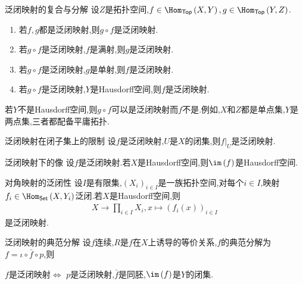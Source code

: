 \begin{proposition}{泛闭映射的复合与分解}{}
	设$Z$是拓扑空间,$f\in\Hom_{\mathsf{Top}}\left(X,Y\right),g\in\Hom_{\mathsf{Top}}\left(Y,Z\right)$.
	\begin{enumerate}
		\item 若$f,g$都是泛闭映射,则$g\circ f$是泛闭映射.
		\item 若$g\circ f$是泛闭映射,$f$是满射,则$g$是泛闭映射.
		\item 若$g\circ f$是泛闭映射,$g$是单射,则$f$是泛闭映射.
		\item 若$g\circ f$是泛闭映射,$Y$是Hausdorff空间,则$f$是泛闭映射.
	\end{enumerate}
\end{proposition}

\begin{remark}{}{}
	若$Y$不是Hausdorff空间,则$g\circ f$可以是泛闭映射而$f$不是.例如,$X$和$Z$都是单点集,$Y$是两点集,三者都配备平庸拓扑.
\end{remark}

\begin{corollary}{泛闭映射在闭子集上的限制}{}
	设$f$是泛闭映射,$U$是$X$的闭集,则$f|_{U}$是泛闭映射.
\end{corollary}

\begin{corollary}{泛闭映射下的像}{}
	设$f$是泛闭映射.若$X$是Hausdorff空间,则$\im\left(f\right)$是Hausdorff空间.
\end{corollary}

\begin{corollary}{对角映射的泛闭性}{}
	设$I$是有限集,$\left(X_{i}\right)_{i\in I}$是一族拓扑空间,对每个$i\in I$,映射$f_{i}\in\Hom_{\mathsf{Set}}\left(X,Y_{i}\right)$泛闭.若$X$是Hausdorff空间,则
	\begin{align*}
		X\to\prod\limits_{i\in I}X_{i},x\mapsto\left(f_{i}\left(x\right)\right)_{i\in I}
	\end{align*}
	是泛闭映射.
\end{corollary}

\begin{corollary}{泛闭映射的典范分解}{}
	设$f$连续,$R$是$f$在$X$上诱导的等价关系,$f$的典范分解为$f=\iota\circ\bar{f}\circ p$,则
	\begin{center}
		$f$是泛闭映射$\iff$ $p$是泛闭映射,$\bar{f}$是同胚,$\im\left(f\right)$是$Y$的闭集.
	\end{center}
\end{corollary}






